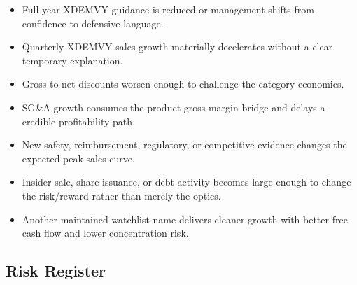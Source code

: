 \documentclass[
  9pt,
]{article}
\providecommand{\tightlist}{%
  \setlength{\itemsep}{0pt}\setlength{\parskip}{0pt}}
\begin{document}
\begin{itemize}
\tightlist
\item
  Full-year XDEMVY guidance is reduced or management shifts from
  confidence to defensive language.
\item
  Quarterly XDEMVY sales growth materially decelerates without a clear
  temporary explanation.
\item
  Gross-to-net discounts worsen enough to challenge the category
  economics.
\item
  SG\&A growth consumes the product gross margin bridge and delays a
  credible profitability path.
\item
  New safety, reimbursement, regulatory, or competitive evidence changes
  the expected peak-sales curve.
\item
  Insider-sale, share issuance, or debt activity becomes large enough to
  change the risk/reward rather than merely the optics.
\item
  Another maintained watchlist name delivers cleaner growth with better
  free cash flow and lower concentration risk.
\end{itemize}

\hypertarget{risk-register}{%
\subsection{Risk Register}\label{risk-register}}
\end{document}
